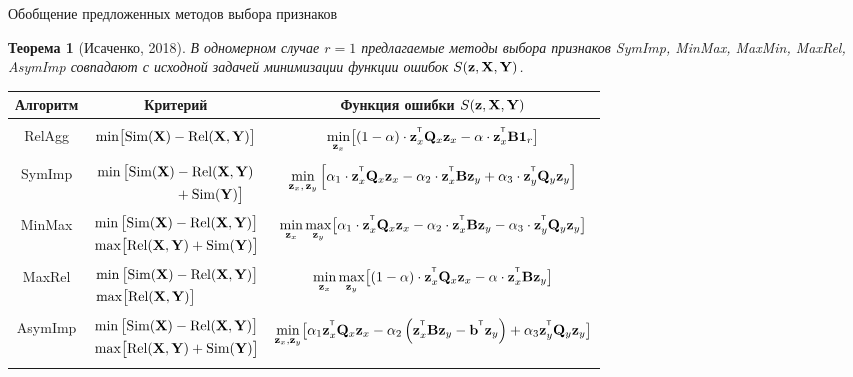 \documentclass[10pt]{beamer}
\newtheorem{rustheorem}{Теорема}
\begin{document}
\begin{frame}{Обобщение предложенных методов выбора признаков}
	\begin{rustheorem}[Исаченко, 2018]
		В одномерном случае $r=1$ предлагаемые методы выбора признаков SymImp, MinMax, MaxMin, MaxRel, AsymImp совпадают с исходной задачей минимизации функции ошибок $S(\bz, \bX, \bY)$.
	\end{rustheorem}
	\vspace{-0.2cm}
	\begin{table}
		\centering
		\footnotesize{
			\begin{tabular}{c|c|c}
				\hline
				Алгоритм & Критерий & Функция ошибки $S(\bz, \bX, \bY)$ \\
				\hline && \\ 
				RelAgg & $\min \bigl[ \text{Sim}(\bX) - \text{Rel}(\bX, \bY) \bigr] $ & $\min\limits_{\bz_x} \bigl[ (1 - \alpha) \cdot \bz_x^{\T} \bQ_x \bz_x - \alpha \cdot \bz_x^{\T} \bB \bOne_r \bigr] $ \\ &&\\
				SymImp & $\begin{aligned} \min \, \bigl[ \text{Sim}(\bX) & - \text{Rel}(\bX, \bY) \\ & + \text{Sim}(\bY) \bigr] \end{aligned}$ & $ \min\limits_{\bz_x, \, \bz_y} \left[ \alpha_1 \cdot \bz_x^{\T} \bQ_x \bz_x - \alpha_2 \cdot \bz_x^{\T} \bB \bz_y + \alpha_3 \cdot \bz_y^{\T} \bQ_y \bz_y \right] $\\ &&\\ 
				MinMax & $\begin{aligned} &\min \, \bigl[ \text{Sim}(\bX) - \text{Rel}(\bX, \bY) \bigr]  \\ & \max \bigl[\text{Rel}(\bX, \bY) + \text{Sim}(\bY) \bigr] \end{aligned}$ & $	\min\limits_{\bz_x} 	\max\limits_{\bz_y} \bigl[\alpha_1 \cdot \bz_x^{\T} \bQ_x \bz_x - \alpha_2 \cdot \bz_x^{\T} \bB \bz_y - \alpha_3 \cdot \bz_y^{\T} \bQ_y \bz_y \bigr]$ \\ &&\\ 
				MaxRel & $\begin{aligned} &\min \, \bigl[ \text{Sim}(\bX) - \text{Rel}(\bX, \bY) \bigr]  \\ & \max \bigl[\text{Rel}(\bX, \bY) \bigr] \end{aligned}$& $\min\limits_{\bz_x} 	\max\limits_{\bz_y} \bigl[ (1 - \alpha) \cdot \bz_x^{\T} \bQ_x \bz_x - \alpha \cdot \bz_x^{\T} \bB \bz_y \bigr]$ \\ 		&&\\
				AsymImp & $\begin{aligned} & \min \, \bigl[ \text{Sim}(\bX) - \text{Rel}(\bX, \bY) \bigr]\\ &  \max \bigl[\text{Rel}(\bX, \bY) + \text{Sim}(\bY) \bigr] \end{aligned}$ & $\min\limits_{\bz_x, \bz_y} \bigl[ \alpha_1 \bz_x^{\T} \bQ_x \bz_x - \alpha_2 \left(\bz_x^{\T} \bB \bz_y - \bb^{\T} \bz_y \right) + \alpha_3  \bz_y^{\T} \bQ_y \bz_y \bigr]$\\  && \\
				\hline
		\end{tabular}}
	\end{table}
\end{frame}
\end{document}
